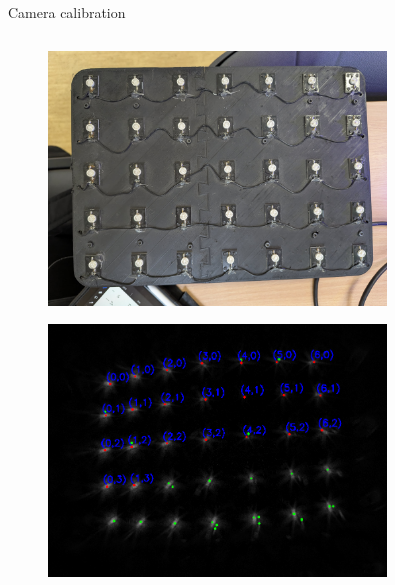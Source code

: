 \documentclass{beamer}
\begin{document}
\begin{frame}{Camera calibration}

\begin{columns}[T]
    \begin{column}{0.48\textwidth}
        \vspace{-0.1cm}
        \begin{figure}[H]
            \centering
            \includegraphics[width=0.8\textwidth]{../fig/photos/lattice.jpeg}
            \label{fig:lattice_img}
        \end{figure}
        
        \vspace{0.1cm}
        
        \begin{figure}[H]
            \centering
            \includegraphics[width=0.8\textwidth]{../fig/photos/lattice_blobs1.png}
            \label{fig:lattice_evs}
        \end{figure}
    \end{column}
    

\end{columns}
\end{frame}
\end{document}
